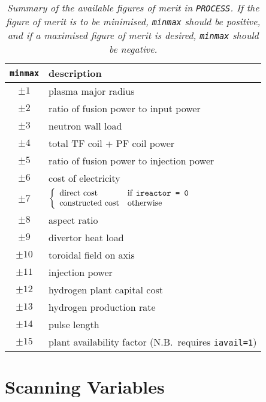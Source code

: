 \documentclass[11pt,a4paper]{report}
\newcommand{\process}{\mbox{\texttt{PROCESS}}}
\begin{document}

\begin{table}[tbph]
\begin{center}

\begin{tabular}{||c|l||} \hline
\texttt{minmax} & description \\ \hline
$\pm 1 $        & plasma major radius \\
$\pm 2 $        & ratio of fusion power to input power \\
$\pm 3 $        & neutron wall load \\
$\pm 4 $        & total TF coil + PF coil power \\
$\pm 5 $        & ratio of fusion power to injection power \\
$\pm 6 $        & cost of electricity \\
$\pm 7 $        & 
$ \left\{ \begin{array}{ll}
 \mbox{direct cost} & \mbox{if \texttt{ireactor = 0}} \\
 \mbox{constructed cost} & \mbox{otherwise}
\end{array} \right. $ \\
$\pm 8 $        & aspect ratio \\
$\pm 9 $        & divertor heat load \\
$\pm 10$        & toroidal field on axis \\
$\pm 11$        & injection power \\
$\pm 12$        & hydrogen plant capital cost \\
$\pm 13$        & hydrogen production rate \\
$\pm 14$        & pulse length \\
$\pm 15$        & plant availability factor (N.B.\ requires \texttt{iavail=1}) \\
\hline
\end{tabular}
\end{center}
\caption[List of figures of merit]
{\label{tab:foms}
  \textit{Summary of the available figures of merit in \process. If the figure
    of merit is to be minimised, \texttt{minmax} should be positive, and if a maximised
    figure of merit is desired, \texttt{minmax} should be negative.}
}
\end{table}

\section{Scanning Variables}
\label{sec:scans}
\end{document}
